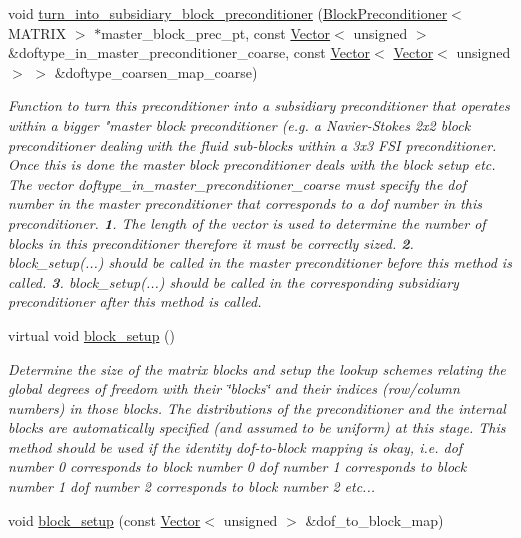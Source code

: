 \begin{DoxyCompactItemize}
void \hyperlink{classoomph_1_1BlockPreconditioner_ae9282acaaf19fa2cdb703d49f1a8de25}{turn\+\_\+into\+\_\+subsidiary\+\_\+block\+\_\+preconditioner} (\hyperlink{classoomph_1_1BlockPreconditioner}{Block\+Preconditioner}$<$ M\+A\+T\+R\+IX $>$ $\ast$master\+\_\+block\+\_\+prec\+\_\+pt, const \hyperlink{classoomph_1_1Vector}{Vector}$<$ unsigned $>$ \&doftype\+\_\+in\+\_\+master\+\_\+preconditioner\+\_\+coarse, const \hyperlink{classoomph_1_1Vector}{Vector}$<$ \hyperlink{classoomph_1_1Vector}{Vector}$<$ unsigned $>$ $>$ \&doftype\+\_\+coarsen\+\_\+map\+\_\+coarse)
\begin{DoxyCompactList}\small\item\em Function to turn this preconditioner into a subsidiary preconditioner that operates within a bigger "master block preconditioner (e.\+g. a Navier-\/\+Stokes 2x2 block preconditioner dealing with the fluid sub-\/blocks within a 3x3 F\+SI preconditioner. Once this is done the master block preconditioner deals with the block setup etc. The vector doftype\+\_\+in\+\_\+master\+\_\+preconditioner\+\_\+coarse must specify the dof number in the master preconditioner that corresponds to a dof number in this preconditioner. {\bfseries 1}. The length of the vector is used to determine the number of blocks in this preconditioner therefore it must be correctly sized. {\bfseries 2}. block\+\_\+setup(...) should be called in the master preconditioner before this method is called. {\bfseries 3}. block\+\_\+setup(...) should be called in the corresponding subsidiary preconditioner after this method is called. \end{DoxyCompactList}\item 
virtual void \hyperlink{classoomph_1_1BlockPreconditioner_af704c4816469cef4fed9d35a9ad651ec}{block\+\_\+setup} ()
\begin{DoxyCompactList}\small\item\em Determine the size of the matrix blocks and setup the lookup schemes relating the global degrees of freedom with their \char`\"{}blocks\char`\"{} and their indices (row/column numbers) in those blocks. The distributions of the preconditioner and the internal blocks are automatically specified (and assumed to be uniform) at this stage. This method should be used if the identity dof-\/to-\/block mapping is okay, i.\+e. dof number 0 corresponds to block number 0 dof number 1 corresponds to block number 1 dof number 2 corresponds to block number 2 etc... \end{DoxyCompactList}\item 
void \hyperlink{classoomph_1_1BlockPreconditioner_a6b70b51b533002ff33a09013aa084e54}{block\+\_\+setup} (const \hyperlink{classoomph_1_1Vector}{Vector}$<$ unsigned $>$ \&dof\+\_\+to\+\_\+block\+\_\+map)

\end{DoxyCompactItemize}

